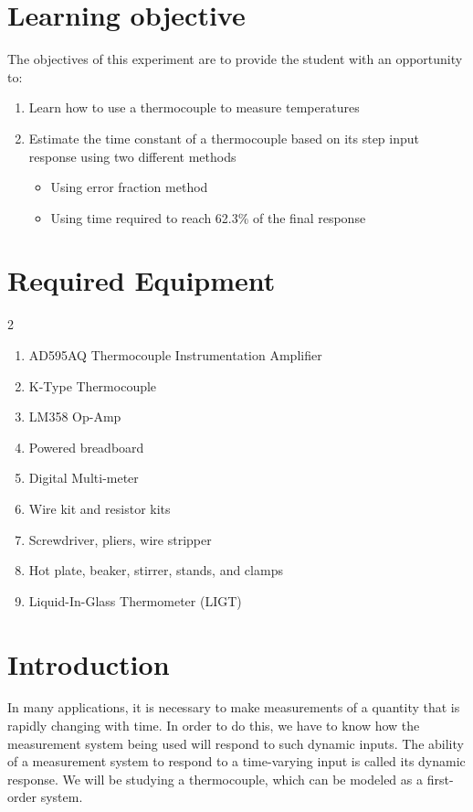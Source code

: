 \documentclass{article} %
\begin{document}


\clearpage

\section{Learning objective}
The objectives of this experiment are to provide the student with an opportunity to:

\begin{enumerate}
    \item Learn how to use a thermocouple to measure temperatures
    \item Estimate the time constant of a thermocouple based on its step input response using two different methods
    \begin{itemize}
        \item Using error fraction method
        \item Using time required to reach 62.3\% of the final response
    \end{itemize}
\end{enumerate}

\section{Required Equipment}
\begin{multicols}{2}
\begin{enumerate}
    \item AD595AQ Thermocouple Instrumentation Amplifier
    \item K-Type Thermocouple
    \item LM358 Op-Amp
    \item Powered breadboard
    \item Digital Multi-meter
    \item Wire kit and resistor kits
    \item Screwdriver, pliers, wire stripper
    \item Hot plate, beaker, stirrer, stands, and clamps
    \item Liquid-In-Glass Thermometer (LIGT)
\end{enumerate}
\end{multicols}

\section{Introduction}
In many applications, it is necessary to make measurements of a quantity that is rapidly changing with time. In order to do this, we have to know how the measurement system being used will respond to such dynamic inputs. The ability of a measurement system to respond to a time-varying input is called its dynamic response. We will be studying a thermocouple, which can be modeled as a first-order system. \\
\end{document}
